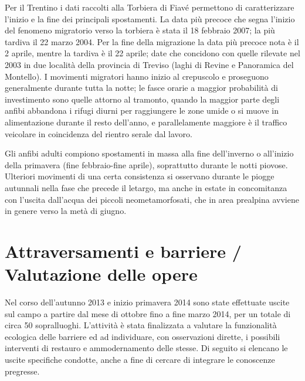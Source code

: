 \documentclass[11pt,a4paper,twoside]{memoir}
\begin{document}
Per il Trentino i dati raccolti alla Torbiera di Fiavé permettono di caratterizzare l'inizio e la fine dei principali spostamenti. La data più precoce che segna l’inizio del fenomeno migratorio verso la torbiera è stata il 18 febbraio 2007; la più tardiva il 22 marzo 2004. Per la fine della migrazione la data più precoce nota è il 2 aprile, mentre la tardiva è il 22 aprile; date che concidono con quelle rilevate nel 2003 in due località della provincia di Treviso (laghi di Revine e Panoramica del Montello).
I movimenti migratori hanno inizio al crepuscolo e proseguono generalmente durante tutta la notte; le fasce orarie a maggior probabilità di investimento sono quelle attorno al tramonto, quando la maggior parte degli anfibi abbandona i rifugi diurni per raggiungere le zone umide o si muove in alimentazione durante il resto dell’anno, e parallelamente maggiore è il traffico veicolare in coincidenza del rientro serale dal lavoro. 

Gli anfibi adulti compiono spostamenti in massa alla fine dell’inverno o all’inizio della primavera (fine febbraio-fine aprile), soprattutto durante le notti piovose. Ulteriori movimenti di una certa consistenza si osservano durante le piogge autunnali nella fase che precede il letargo, ma anche in estate in concomitanza con l’uscita dall’acqua dei piccoli neometamorfosati, che in area prealpina avviene in genere verso la metà di giugno.


\chapter{Attraversamenti e barriere / Valutazione delle opere}
\label{chap:ricercacampo}
Nel corso dell’autunno 2013 e inizio primavera 2014 sono state effettuate uscite sul campo a partire dal mese di ottobre fino a fine marzo 2014, per un totale di circa 50 sopralluoghi. L’attività è stata finalizzata a valutare la funzionalità ecologica delle barriere ed ad individuare, con osservazioni dirette, i possibili interventi di restauro e ammodernamento delle stesse. Di seguito si elencano le uscite specifiche condotte, anche a fine di cercare di integrare le conoscenze pregresse.
\end{document}
